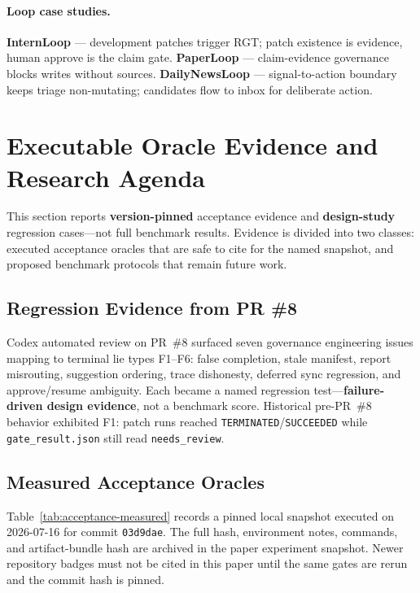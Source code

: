 \documentclass[11pt]{article}
\newcommand{\rgt}{\textsc{RGT}}
\begin{document}
\paragraph{Loop case studies.}
\textbf{InternLoop} --- development patches trigger \rgt{}; patch existence is evidence, human approve is the claim gate.
\textbf{PaperLoop} --- claim-evidence governance blocks writes without sources.
\textbf{DailyNewsLoop} --- signal-to-action boundary keeps triage non-mutating; candidates flow to inbox for deliberate action.

\section{Executable Oracle Evidence and Research Agenda}
\label{sec:evidence}

This section reports \textbf{version-pinned} acceptance evidence and \textbf{design-study} regression cases---not full benchmark results.
Evidence is divided into two classes: executed acceptance oracles that are safe to cite for the named snapshot, and proposed benchmark protocols that remain future work.

\subsection{Regression Evidence from PR \#8}
Codex automated review on PR~\#8 surfaced seven governance engineering issues mapping to terminal lie types F1--F6: false completion, stale manifest, report misrouting, suggestion ordering, trace dishonesty, deferred sync regression, and approve/resume ambiguity.
Each became a named regression test---\textbf{failure-driven design evidence}, not a benchmark score.
Historical pre-PR~\#8 behavior exhibited F1: patch runs reached \texttt{TERMINATED}/\texttt{SUCCEEDED} while \texttt{gate\_result.json} still read \texttt{needs\_review}.

\subsection{Measured Acceptance Oracles}
Table~\ref{tab:acceptance-measured} records a pinned local snapshot executed on 2026-07-16 for commit \texttt{03d9dae}.
The full hash, environment notes, commands, and artifact-bundle hash are archived in the paper experiment snapshot.
Newer repository badges must not be cited in this paper until the same gates are rerun and the commit hash is pinned.
\end{document}
